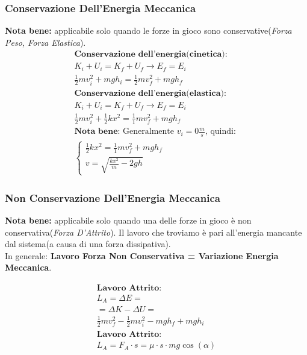 \subsubsection{Conservazione Dell'Energia Meccanica}
\textbf{Nota bene: } applicabile solo quando le forze in gioco sono conservative(\textit{Forza Peso, Forza Elastica}).
\begin{gather*}
    \textbf{Conservazione dell'energia(cinetica): } \\ K_i + U_i = K_f + U_f \rightarrow E_f = E_i \\ \frac{1}{2} m v_i^2 + mgh_i = \frac{1}{2} mv_f^2 + mgh_f \\
    \textbf{Conservazione dell'energia(elastica): } \\ K_i + U_i = K_f + U_f \rightarrow E_f = E_i \\ \frac{1}{2} m v_i^2 + \frac{1}{2}kx^2 = \frac{1}{1}mv_f^2 + mgh_f \\
    \textbf{Nota bene: }\text{Generalmente $v_i = 0 \frac{m}{s}$, quindi: } \\
    \begin{cases}
        \frac{1}{2}kx^2 = \frac{1}{1}mv_f^2 + mgh_f \\
        v = \sqrt{\frac{k x^2}{m} - 2gh}
    \end{cases}
\end{gather*}

\subsubsection{Non Conservazione Dell'Energia Meccanica}

\textbf{Nota bene: } applicabile solo quando una delle forze in gioco è non conservativa(\textit{Forza D'Attrito}). Il lavoro che troviamo è pari all'energia mancante dal sistema(a causa di una forza dissipativa). \\
In generale: \textbf{Lavoro Forza Non Conservativa = Variazione Energia Meccanica}.

\begin{gather*}
    \textbf{Lavoro Attrito: } \\ L_A = \Delta E = \\ = \Delta K - \Delta U = \\ \frac{1}{2} m v_f^2 - \frac{1}{2} m v_i^2 - mgh_f + mgh_i \\
    \textbf{Lavoro Attrito: } \\ L_A = F_{A} \cdot s = \mu \cdot s \cdot m g \cos (\alpha)
\end{gather*}